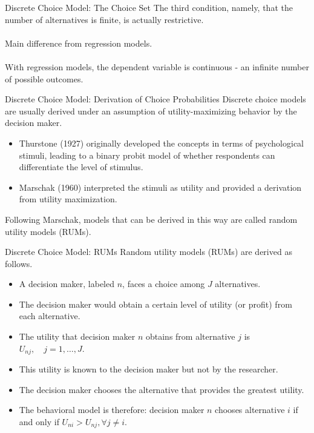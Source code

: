 \begin{frame}{Discrete Choice Model: The Choice Set}
The third condition, namely, that the number of alternatives is finite, is actually restrictive.
\\ \hspace*{\fill} \\
Main difference from regression models.
\\ \hspace*{\fill} \\
With regression models, the dependent variable is continuous - an infinite number of possible outcomes.
\end{frame}


\begin{frame}{Discrete Choice Model: Derivation of Choice Probabilities}
Discrete choice models are usually derived under an assumption of utility-maximizing behavior by the decision maker.
\begin{itemize}
\item Thurstone (1927) originally developed the concepts in terms of psychological stimuli,
leading to a binary probit model of whether respondents can differentiate the level of stimulus.
\item Marschak (1960) interpreted the stimuli as utility and provided a derivation from utility maximization.
\end{itemize}

Following Marschak, models that can be derived in this way are called random
utility models (RUMs).
\end{frame}



\begin{frame}{Discrete Choice Model: RUMs}
Random utility models (RUMs) are derived as follows.
\begin{itemize}
\item A decision maker, labeled $n$, faces a choice among $J$ alternatives.
\item The decision maker would obtain a certain level of utility (or profit) from each alternative.
\item The utility that decision maker $n$ obtains from alternative $j$ is $U_{n j}, \quad j=1, \ldots, J$.
\item This utility is known to the decision maker but not by the researcher.
\item The decision maker chooses the alternative that provides the greatest utility.
\item The behavioral model is therefore: decision maker $n$ chooses alternative $i$ if and only if $U_{n i}>U_{n j}, \forall j \neq i$.
\end{itemize}
\end{frame}


